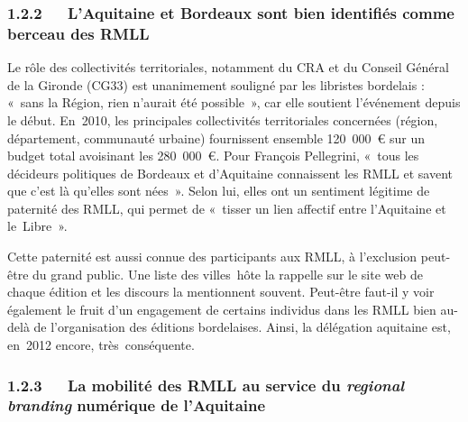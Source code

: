 \documentclass{FramateX}
\begin{document}
\begin{refsection}
\subsubsection*{1.2.2~~~L'Aquitaine et Bordeaux sont bien identifiés comme berceau des RMLL}
{}

Le rôle des collectivités territoriales, notamment du CRA et du Conseil
Général de la Gironde (CG33) est unanimement souligné par les libristes
bordelais : «~sans la Région, rien n'aurait été
possible~», car elle soutient l'événement depuis le début. En~2010,
les principales collectivités territoriales concernées (région,
département, communauté urbaine) fournissent ensemble 120~000~€ sur un
budget total avoisinant les 280~000~€. Pour François Pellegrini,
«~tous les décideurs politiques de Bordeaux et
d'Aquitaine connaissent les RMLL et savent que c'est là qu'elles sont
nées~». Selon lui, elles ont un sentiment légitime de paternité des
RMLL, qui permet de «~tisser un lien affectif entre
l'Aquitaine et le~Libre~».

Cette paternité est aussi connue des participants aux RMLL, à
l'exclusion peut-être du grand public. Une liste des villes~hôte la
rappelle sur le site web de chaque édition et les discours la
mentionnent souvent. Peut-être faut-il y voir également le fruit d'un
engagement de certains individus dans les RMLL bien au-delà de
l'organisation des éditions bordelaises. Ainsi, la délégation aquitaine
est, en~2012 encore, très~conséquente.

\subsubsection*{1.2.3~~~La mobilité des RMLL au service du \textit{regional branding} numérique de l'Aquitaine}
{}


\end{refsection}
\end{document}
